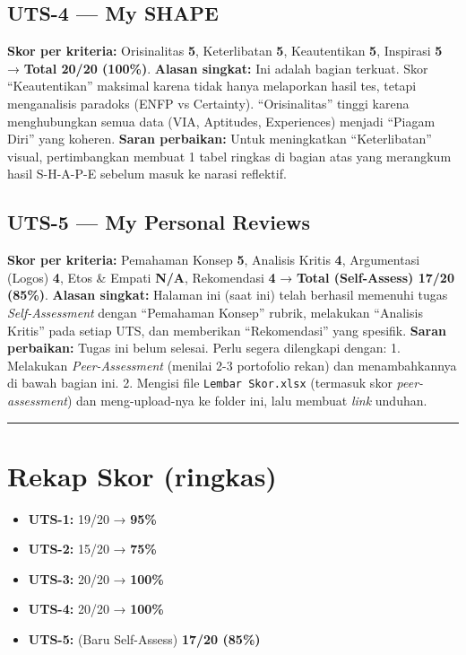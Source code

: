\documentclass[
  letterpaper,
  DIV=11,
  numbers=noendperiod]{scrreprt}
\providecommand{\tightlist}{%
  \setlength{\itemsep}{0pt}\setlength{\parskip}{0pt}}
\begin{document}
\subsection{UTS-4 --- My SHAPE}\label{uts-4-my-shape}

\textbf{Skor per kriteria:} Orisinalitas \textbf{5}, Keterlibatan
\textbf{5}, Keautentikan \textbf{5}, Inspirasi \textbf{5} →
\textbf{Total 20/20 (100\%)}. \textbf{Alasan singkat:} Ini adalah bagian
terkuat. Skor ``Keautentikan'' maksimal karena tidak hanya melaporkan
hasil tes, tetapi menganalisis paradoks (ENFP vs Certainty).
``Orisinalitas'' tinggi karena menghubungkan semua data (VIA, Aptitudes,
Experiences) menjadi ``Piagam Diri'' yang koheren. \textbf{Saran
perbaikan:} Untuk meningkatkan ``Keterlibatan'' visual, pertimbangkan
membuat 1 tabel ringkas di bagian atas yang merangkum hasil S-H-A-P-E
sebelum masuk ke narasi reflektif.

\subsection{UTS-5 --- My Personal
Reviews}\label{uts-5-my-personal-reviews-1}

\textbf{Skor per kriteria:} Pemahaman Konsep \textbf{5}, Analisis Kritis
\textbf{4}, Argumentasi (Logos) \textbf{4}, Etos \& Empati \textbf{N/A},
Rekomendasi \textbf{4} → \textbf{Total (Self-Assess) 17/20 (85\%)}.
\textbf{Alasan singkat:} Halaman ini (saat ini) telah berhasil memenuhi
tugas \emph{Self-Assessment} dengan ``Pemahaman Konsep'' rubrik,
melakukan ``Analisis Kritis'' pada setiap UTS, dan memberikan
``Rekomendasi'' yang spesifik. \textbf{Saran perbaikan:} Tugas ini belum
selesai. Perlu segera dilengkapi dengan: 1. Melakukan
\emph{Peer-Assessment} (menilai 2-3 portofolio rekan) dan menambahkannya
di bawah bagian ini. 2. Mengisi file \texttt{Lembar\ Skor.xlsx}
(termasuk skor \emph{peer-assessment}) dan meng-upload-nya ke folder
ini, lalu membuat \emph{link} unduhan.

\begin{center}\rule{0.5\linewidth}{0.5pt}\end{center}

\section{Rekap Skor (ringkas)}\label{rekap-skor-ringkas}

\begin{itemize}
\tightlist
\item
  \textbf{UTS-1:} 19/20 → \textbf{95\%}
\item
  \textbf{UTS-2:} 15/20 → \textbf{75\%}
\item
  \textbf{UTS-3:} 20/20 → \textbf{100\%}
\item
  \textbf{UTS-4:} 20/20 → \textbf{100\%}
\item
  \textbf{UTS-5:} (Baru Self-Assess) \textbf{17/20 (85\%)}
\end{itemize}
\end{document}
